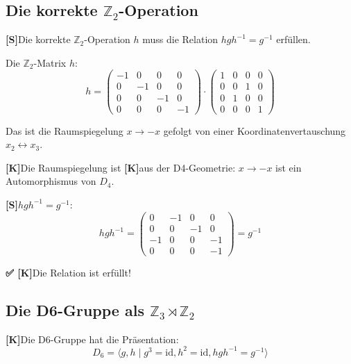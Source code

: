 \documentclass[11pt,a4paper]{article}
\newcommand{\Kstatus}{\textbf{[K]}}
\newcommand{\Sstatus}{\textbf{[S]}}
\newcommand{\Checkmark}{\textbf{✅ [K]}}
\begin{document}
	\subsection{Die korrekte $\mathbb{Z}_2$-Operation}
	
	\Sstatus Die korrekte $\mathbb{Z}_2$-Operation $h$ muss die Relation $h g h^{-1} = g^{-1}$ erfüllen.
	
	Die $\mathbb{Z}_2$-Matrix $h$:
	\begin{equation}
		h = \begin{pmatrix}
			-1 & 0 & 0 & 0 \\
			0 & -1 & 0 & 0 \\
			0 & 0 & -1 & 0 \\
			0 & 0 & 0 & -1
		\end{pmatrix} \cdot \begin{pmatrix}
			1 & 0 & 0 & 0 \\
			0 & 0 & 1 & 0 \\
			0 & 1 & 0 & 0 \\
			0 & 0 & 0 & 1
		\end{pmatrix}
	\end{equation}
	
	Das ist die Raumspiegelung $x \to -x$ gefolgt von einer Koordinatenvertauschung $x_2 \leftrightarrow x_3$.
	
	\Kstatus Die Raumspiegelung ist \Kstatus aus der D4-Geometrie: $x \to -x$ ist ein Automorphismus von $D_4$.
	
	\Sstatus $h g h^{-1} = g^{-1}$:
	\begin{equation}
		h g h^{-1} = \begin{pmatrix}
			0 & -1 & 0 & 0 \\
			0 & 0 & -1 & 0 \\
			-1 & 0 & 0 & -1 \\
			0 & 0 & 0 & -1
		\end{pmatrix} = g^{-1}
	\end{equation}
	
	\Checkmark Die Relation ist erfüllt!
	
	\subsection{Die D6-Gruppe als $\mathbb{Z}_3 \rtimes \mathbb{Z}_2$}
	
	\Kstatus Die D6-Gruppe hat die Präsentation:
	\begin{equation}
		D_6 = \langle g, h \mid g^3 = \text{id}, h^2 = \text{id}, h g h^{-1} = g^{-1} \rangle
	\end{equation}
	
\end{document}
